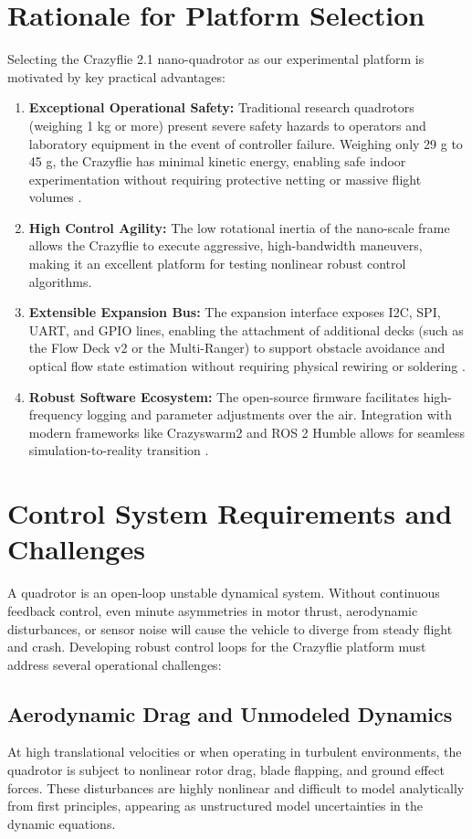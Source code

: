 \section{Rationale for Platform Selection}
Selecting the Crazyflie 2.1 nano-quadrotor as our experimental platform is motivated by key practical advantages:
\begin{enumerate}
    \item \textbf{Exceptional Operational Safety:} Traditional research quadrotors (weighing 1 kg or more) present severe safety hazards to operators and laboratory equipment in the event of controller failure. Weighing only 29 g to 45 g, the Crazyflie has minimal kinetic energy, enabling safe indoor experimentation without requiring protective netting or massive flight volumes \cite{ref_41, ref_46}.
    \item \textbf{High Control Agility:} The low rotational inertia of the nano-scale frame allows the Crazyflie to execute aggressive, high-bandwidth maneuvers, making it an excellent platform for testing nonlinear robust control algorithms.
    \item \textbf{Extensible Expansion Bus:} The expansion interface exposes I2C, SPI, UART, and GPIO lines, enabling the attachment of additional decks (such as the Flow Deck v2 or the Multi-Ranger) to support obstacle avoidance and optical flow state estimation without requiring physical rewiring or soldering \cite{ref_40}.
    \item \textbf{Robust Software Ecosystem:} The open-source firmware facilitates high-frequency logging and parameter adjustments over the air. Integration with modern frameworks like Crazyswarm2 and ROS 2 Humble allows for seamless simulation-to-reality transition \cite{ref_39}.
\end{enumerate}

\section{Control System Requirements and Challenges}
A quadrotor is an open-loop unstable dynamical system. Without continuous feedback control, even minute asymmetries in motor thrust, aerodynamic disturbances, or sensor noise will cause the vehicle to diverge from steady flight and crash. Developing robust control loops for the Crazyflie platform must address several operational challenges:

\subsection{Aerodynamic Drag and Unmodeled Dynamics}
At high translational velocities or when operating in turbulent environments, the quadrotor is subject to nonlinear rotor drag, blade flapping, and ground effect forces. These disturbances are highly nonlinear and difficult to model analytically from first principles, appearing as unstructured model uncertainties in the dynamic equations.

